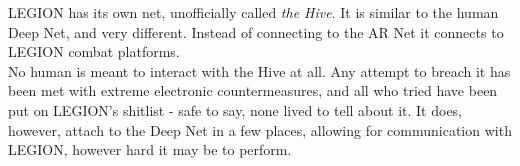 LEGION has its own net, unofficially called \emph{the Hive}.
It is similar to the human Deep Net, and very different.
Instead of connecting to the AR Net it connects to LEGION combat platforms.
\\%
No human is meant to interact with the Hive at all.
Any attempt to breach it has been met with extreme electronic countermeasures, and all who tried have been put on LEGION's shitlist - safe to say, none lived to tell about it.
It does, however, attach to the Deep Net in a few places, allowing for communication with LEGION, however hard it may be to perform.

